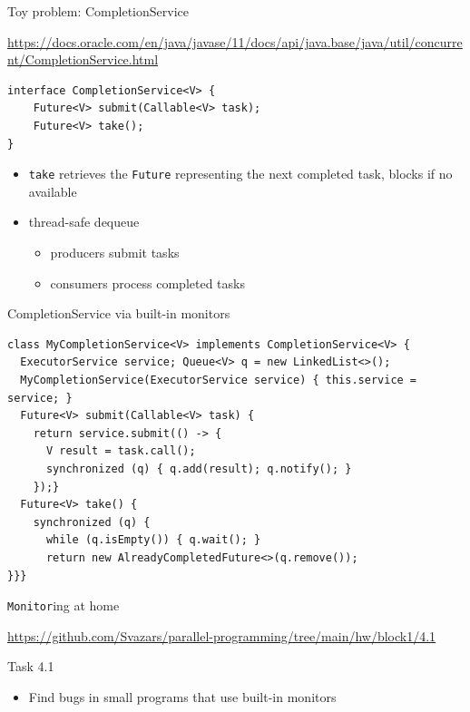 \begin{frame}[fragile]{Toy problem: CompletionService}

{\tiny\url{https://docs.oracle.com/en/java/javase/11/docs/api/java.base/java/util/concurrent/CompletionService.html}}
\begin{verbatim}
interface CompletionService<V> {
    Future<V> submit(Callable<V> task);
    Future<V> take();
}
\end{verbatim}
\begin{itemize}
    \item \texttt{take} retrieves the \texttt{Future} representing the next completed task, blocks if no available
    \item thread-safe dequeue
    \begin{itemize}
        \item producers submit tasks
        \item consumers process completed tasks
    \end{itemize}
\end{itemize}
\end{frame}

\begin{frame}{CompletionService via built-in monitors}
\begin{verbatim}
class MyCompletionService<V> implements CompletionService<V> {
  ExecutorService service; Queue<V> q = new LinkedList<>();
  MyCompletionService(ExecutorService service) { this.service = service; }    
  Future<V> submit(Callable<V> task) {
    return service.submit(() -> {
      V result = task.call();
      synchronized (q) { q.add(result); q.notify(); }
    });}
  Future<V> take() {
    synchronized (q) { 
      while (q.isEmpty()) { q.wait(); }
      return new AlreadyCompletedFuture<>(q.remove());
}}}
\end{verbatim}
\end{frame}


\begin{frame}[fragile]{\texttt{Monitor}ing at home}

{\small\url{https://github.com/Svazars/parallel-programming/tree/main/hw/block1/4.1}}
\begin{homeworkmail}{Task 4.1}
    \begin{itemize}
        \item Find bugs in small programs that use built-in monitors
    \end{itemize}
\end{homeworkmail}

\end{frame}


